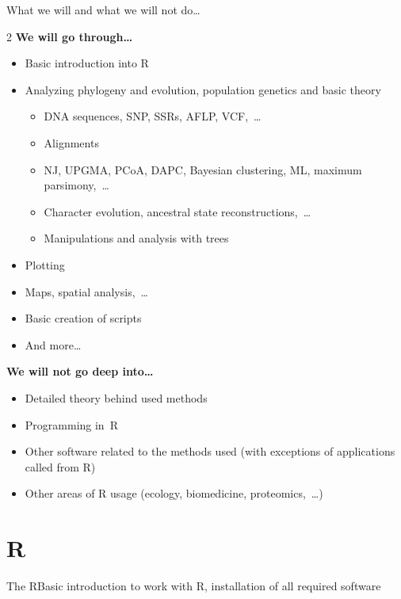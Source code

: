 \documentclass[compress, xelatex, 11pt, xcolor=svgnames, aspectratio=169, url={hyphens, lowtilde}]{beamer}
\begin{document}
\begin{frame}{What we will and what we will not do\ldots}
	\begin{multicols}{2}
		\textbf{We will go through\ldots}
		\begin{itemize}
			\item Basic introduction into R
			\item Analyzing phylogeny and evolution, population genetics and basic theory
			\begin{itemize}
				\item DNA sequences, SNP, SSRs, AFLP, VCF,~\ldots
				\item Alignments
				\item NJ, UPGMA, PCoA, DAPC, Bayesian clustering, ML, maximum parsimony,~\ldots
				\item Character evolution, ancestral state reconstructions,~\ldots
				\item Manipulations and analysis with trees
			\end{itemize}
			\item Plotting
		\columnbreak
			\item Maps, spatial analysis,~\ldots
			\item Basic creation of scripts
			\item And more\ldots
		\end{itemize}
		\textbf{We will not go deep into\ldots}
		\begin{itemize}
			\item Detailed theory behind used methods
			\item Programming in~R
			\item Other software related to the methods used (with exceptions of applications called from R)
			\item Other areas of R usage (ecology, biomedicine, proteomics,~\ldots)
		\end{itemize}
	\end{multicols}
\end{frame}

\section{R}

\begin{frame}{The R}{Basic introduction to work with R, installation of all required software}
	\tableofcontents[currentsection, sectionstyle=show/hide, hideothersubsections]
\end{frame}
\end{document}
